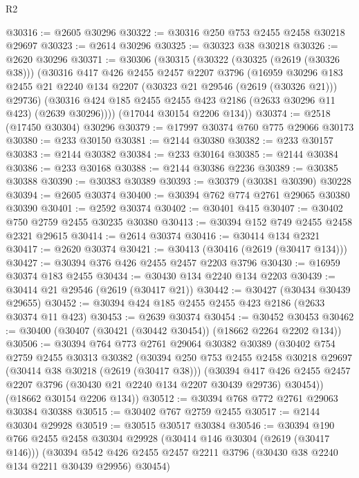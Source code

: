 \begin{lexlean}{R2}
\begin{coremodule}
@30316 := @2605 @30296
@30322 := @30316 @250 @753 @2455 @2458 @30218 @29697
@30323 := @2614 @30296
@30325 := @30323 @38 @30218
@30326 := @2620 @30296
@30371 := @30306
    (@30315
      (@30322
        (@30325 (@2619 (@30326 @38)))
        (@30316
          @417
          @426
          @2455
          @2457
          @2207
          @3796
          (@16959
            @30296
            @183
            @2455
            @21
            @2240
            @134
            @2207
            (@30323 @21 @29546 (@2619 (@30326 @21)))
            @29736)
          (@30316 @424 @185 @2455 @2455 @423 @2186 (@2633 @30296 @11 @423) (@2639 @30296))))
      (@17044 @30154 @2206 @134))
@30374 := @2518 (@17450 @30304) @30296
@30379 := @17997 @30374 @760 @775 @29066 @30173
@30380 := @233 @30150
@30381 := @2144 @30380
@30382 := @233 @30157
@30383 := @2144 @30382
@30384 := @233 @30164
@30385 := @2144 @30384
@30386 := @233 @30168
@30388 := @2144 @30386 @2236
@30389 := @30385 @30388
@30390 := @30383 @30389
@30393 := @30379 (@30381 @30390) @30228
@30394 := @2605 @30374
@30400 := @30394 @762 @774 @2761 @29065 @30380 @30390
@30401 := @2592 @30374
@30402 := @30401 @415
@30407 := @30402 @750 @2759 @2455 @30235 @30380
@30413 := @30394 @152 @749 @2455 @2458 @2321 @29615
@30414 := @2614 @30374
@30416 := @30414 @134 @2321
@30417 := @2620 @30374
@30421 := @30413 (@30416 (@2619 (@30417 @134)))
@30427 := @30394 @376 @426 @2455 @2457 @2203 @3796
@30430 := @16959 @30374 @183 @2455
@30434 := @30430 @134 @2240 @134 @2203
@30439 := @30414 @21 @29546 (@2619 (@30417 @21))
@30442 := @30427 (@30434 @30439 @29655)
@30452 := @30394 @424 @185 @2455 @2455 @423 @2186 (@2633 @30374 @11 @423)
@30453 := @2639 @30374
@30454 := @30452 @30453
@30462 := @30400 (@30407 (@30421 (@30442 @30454)) (@18662 @2264 @2202 @134))
@30506 := @30394
    @764
    @773
    @2761
    @29064
    @30382
    @30389
    (@30402
      @754
      @2759
      @2455
      @30313
      @30382
      (@30394
        @250
        @753
        @2455
        @2458
        @30218
        @29697
        (@30414 @38 @30218 (@2619 (@30417 @38)))
        (@30394
          @417
          @426
          @2455
          @2457
          @2207
          @3796
          (@30430 @21 @2240 @134 @2207 @30439 @29736)
          @30454))
      (@18662 @30154 @2206 @134))
@30512 := @30394 @768 @772 @2761 @29063 @30384 @30388
@30515 := @30402 @767 @2759 @2455
@30517 := @2144 @30304 @29928
@30519 := @30515 @30517 @30384
@30546 := @30394
    @190
    @766
    @2455
    @2458
    @30304
    @29928
    (@30414 @146 @30304 (@2619 (@30417 @146)))
    (@30394 @542 @426 @2455 @2457 @2211 @3796 (@30430 @38 @2240 @134 @2211 @30439 @29956) @30454)

\end{coremodule}
\end{lexlean}
